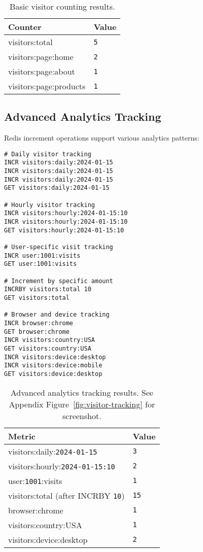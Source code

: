 \begin{table}[H]
  \centering
  \begin{tabular}{|l|l|}
    \hline
    \textbf{Counter} & \textbf{Value} \\
    \hline
    visitors:total & \texttt{5} \\
    visitors:page:home & \texttt{2} \\
    visitors:page:about & \texttt{1} \\
    visitors:page:products & \texttt{1} \\
    \hline
  \end{tabular}
  \caption{Basic visitor counting results.}
\end{table}

\subsection{Advanced Analytics Tracking}

Redis increment operations support various analytics patterns:

\begin{verbatim}
# Daily visitor tracking
INCR visitors:daily:2024-01-15
INCR visitors:daily:2024-01-15
INCR visitors:daily:2024-01-15
GET visitors:daily:2024-01-15

# Hourly visitor tracking
INCR visitors:hourly:2024-01-15:10
INCR visitors:hourly:2024-01-15:10
GET visitors:hourly:2024-01-15:10

# User-specific visit tracking
INCR user:1001:visits
GET user:1001:visits

# Increment by specific amount
INCRBY visitors:total 10
GET visitors:total

# Browser and device tracking
INCR browser:chrome
GET browser:chrome
INCR visitors:country:USA
GET visitors:country:USA
INCR visitors:device:desktop
INCR visitors:device:mobile
GET visitors:device:desktop
\end{verbatim}

\begin{table}[H]
  \centering
  \begin{tabular}{|l|l|}
    \hline
    \textbf{Metric} & \textbf{Value} \\
    \hline
    visitors:daily:\texttt{2024-01-15} & \texttt{3} \\
    visitors:hourly:\texttt{2024-01-15:10} & \texttt{2} \\
    user:\texttt{1001}:visits & \texttt{1} \\
    visitors:total (after INCRBY \texttt{10}) & \texttt{15} \\
    browser:chrome & \texttt{1} \\
    visitors:country:USA & \texttt{1} \\
    visitors:device:desktop & \texttt{2} \\
    \hline
  \end{tabular}
  \caption{Advanced analytics tracking results. See Appendix Figure~\ref{fig:visitor-tracking} for screenshot.}
\end{table}

